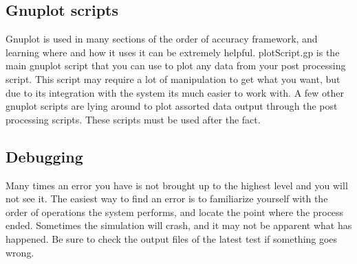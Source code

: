 \subsection{Gnuplot scripts}
Gnuplot is used in many sections of the order of accuracy framework, and learning where and how it uses it can be extremely helpful. plotScript.gp is the main gnuplot script that you can use to plot any data from your post processing script. This script may require a lot of manipulation to get what you want, but due to its integration with the system its much easier to work with. A few other gnuplot scripts are lying around to plot assorted data output through the post processing scripts. These scripts must be used after the fact.

\subsection{Debugging}
Many times an error you have is not brought up to the highest level and you will not see it. The easiest way to find an error is to familiarize yourself with the order of operations the system performs, and locate the point where the process ended. Sometimes the simulation will crash, and it may not be apparent what has happened. Be sure to check the output files of the latest test if something goes wrong.




